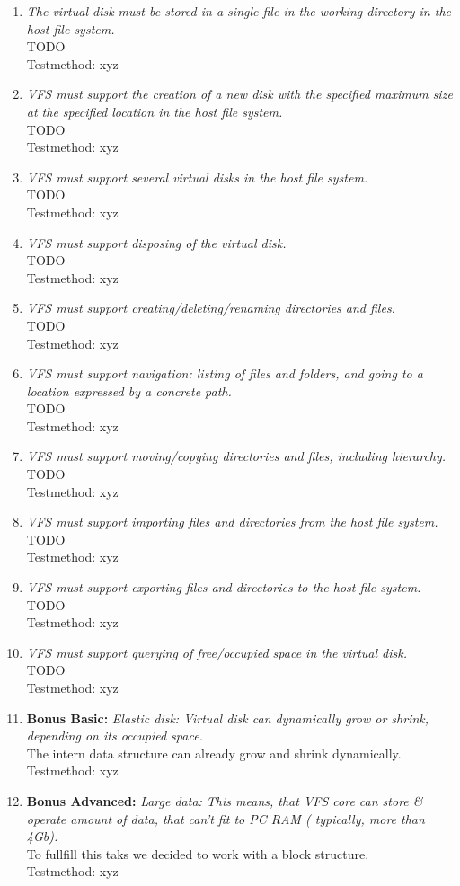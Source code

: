 \documentclass[a4paper,12pt]{article}
\begin{document}
\begin{enumerate}
	\item \emph{The virtual disk must be stored in a single file in the working directory in the host file system.}\\
		TODO\\
		Testmethod: xyz
	\item \emph{VFS must support the creation of a new disk with the specified maximum size at the specified
location in the host file system.}\\
		TODO\\
		Testmethod: xyz
	\item \emph{VFS must support several virtual disks in the host file system.}\\
		TODO\\
		Testmethod: xyz
	\item \emph{VFS must support disposing of the virtual disk.}\\
		TODO\\
		Testmethod: xyz
	\item \emph{VFS must support creating/deleting/renaming directories and files.}\\
		TODO\\
		Testmethod: xyz
	\item \emph{VFS must support navigation: listing of files and folders, and going to a location expressed by a
concrete path.}\\
		TODO\\
		Testmethod: xyz
	\item \emph{VFS must support moving/copying directories and files, including hierarchy.}\\
		TODO\\
		Testmethod: xyz
	\item \emph{VFS must support importing files and directories from the host file system.}\\
		TODO\\
		Testmethod: xyz
	\item \emph{VFS must support exporting files and directories to the host file system.}\\
		TODO\\
		Testmethod: xyz
	\item \emph{VFS must support querying of free/occupied space in the virtual disk.}\\
		TODO\\
		Testmethod: xyz
	\item \textbf{Bonus Basic:} \emph{Elastic disk: Virtual disk can dynamically grow or shrink, depending on its occupied space.}\\
		The intern data structure can already grow and shrink dynamically.\\
		Testmethod: xyz
	\item \textbf{Bonus Advanced:} \emph{Large data: This means, that VFS core can store \& operate amount of data, that can't fit to PC RAM ( typically, more than 4Gb).}\\
		To fullfill this taks we decided to work with a block structure.\\
		Testmethod: xyz
\end{enumerate}
\end{document}
